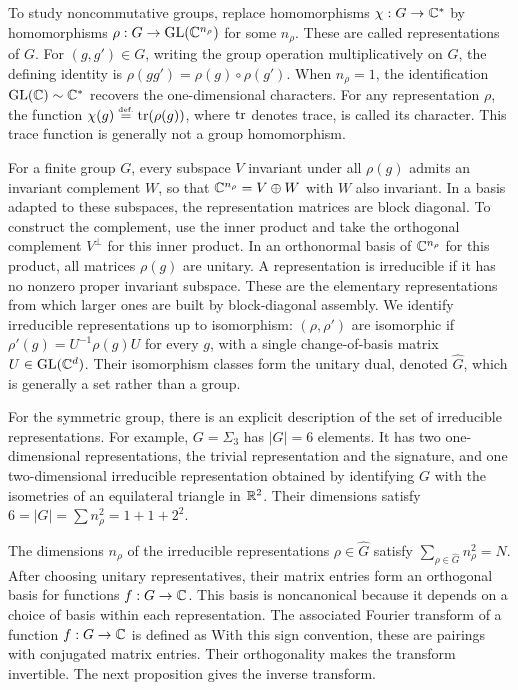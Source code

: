 To study noncommutative groups, replace homomorphisms $\chi : G \rightarrow \mathbb{C}^*$ by homomorphisms $\rho : G \rightarrow \text{GL}(\mathbb{C}^{n_\rho})$ for some $n_\rho$. These are called representations of $G$. For $(g,g') \in G$, writing the group operation multiplicatively on $G$, the defining identity is $\rho(gg')=\rho(g) \circ \rho(g')$. When $n_\rho=1$, the identification $\text{GL}(\mathbb{C}) \sim \mathbb{C}^*$ recovers the one-dimensional characters. For any representation $\rho$, the function $\chi(g) \stackrel{\mbox{\upshape\tiny def.}}{=} \operatorname{tr}(\rho(g))$, where $\operatorname{tr}$ denotes trace, is called its character. This trace function is generally not a group homomorphism.

For a finite group $G$, every subspace $V$ invariant under all $\rho(g)$ admits an invariant complement $W$, so that $\mathbb{C}^{n_\rho}=V\oplus W$ with $W$ also invariant. In a basis adapted to these subspaces, the representation matrices are block diagonal. To construct the complement, use the inner product
and take the orthogonal complement $V^\bot$ for this inner product. In an orthonormal basis of $\mathbb{C}^{n_\rho}$ for this product, all matrices $\rho(g)$ are unitary.
%
A representation is irreducible if it has no nonzero proper invariant subspace. These are the elementary representations from which larger ones are built by block-diagonal assembly.
%
We identify irreducible representations up to isomorphism: $(\rho,\rho')$ are isomorphic if $\rho'(g)=U^{-1}\rho(g)U$ for every $g$, with a single change-of-basis matrix $U \in \text{GL}(\mathbb{C}^d)$. Their isomorphism classes form the unitary dual, denoted $\hat G$, which is generally a set rather than a group.

For the symmetric group, there is an explicit description of the set of irreducible representations.  
%
For example, $G=\Sigma_3$ has $|G|=6$ elements. It has two one-dimensional representations, the trivial representation and the signature, and one two-dimensional irreducible representation obtained by identifying $G$ with the isometries of an equilateral triangle in $\mathbb{R}^2$. Their dimensions satisfy $6 = |G| = \sum n_\rho^2 = 1+1+2^2$.

The dimensions $n_\rho$ of the irreducible representations $\rho\in\hat G$ satisfy $\sum_{\rho \in \hat G} n_\rho^2 = N$. After choosing unitary representatives, their matrix entries form an orthogonal basis for functions $f : G \rightarrow \mathbb{C}$. This basis is noncanonical because it depends on a choice of basis within each representation.
%
The associated Fourier transform of a function $f:G\rightarrow\mathbb{C}$ is defined as
With this sign convention, these are pairings with conjugated matrix entries. Their orthogonality makes the transform invertible.
%
The next proposition gives the inverse transform.

